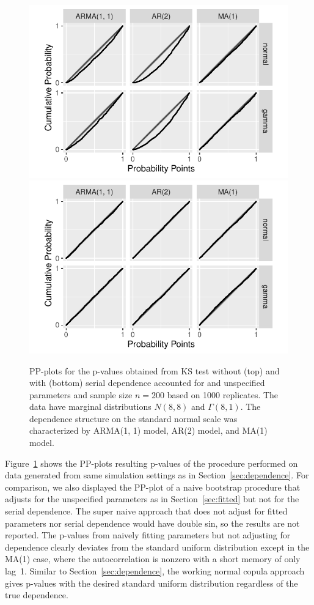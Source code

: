 \documentclass[12pt, letterpaper, titlepage]{article}
\begin{document}
\begin{figure}[tbp]
  \centering
  \includegraphics[width=.75\textwidth]{pp_s_f.pdf}
  \includegraphics[width=.75\textwidth]{pp_ssf.pdf}
  \caption{PP-plots for the p-values obtained from KS test without (top) and 
	  with (bottom)
    serial dependence accounted for and unspecified parameters and sample size
    $n = 200$ based on
    1000 replicates. The data have marginal distributions $N(8, 8)$ and
    $\Gamma(8, 1)$. The dependence structure on the standard normal scale was
    characterized by ARMA(1, 1) model, AR(2) model, and MA(1) model.
  }
  \label{fig:pp_ssf}
\end{figure}

Figure~\ref{fig:pp_ssf} shows the PP-plots resulting p-values of the
procedure performed on data generated from same simulation settings as in
Section~\ref{sec:dependence}. For comparison, we also displayed the PP-plot of
a naive bootstrap procedure that adjusts for the unspecified parameters as in
Section~\ref{sec:fitted} but not for the serial dependence. 
The super naive approach that does not adjust for fitted parameters nor serial
dependence would have double sin, so the results are not reported. 
The p-values from
naively fitting parameters but not adjusting for dependence clearly deviates
from the standard uniform distribution except in the MA(1) case, where the
autocorrelation is nonzero with a short memory of only lag~1.
Similar to Section~\ref{sec:dependence}, the working normal copula approach
gives p-values with the desired standard uniform distribution regardless of the
true dependence.
\end{document}
